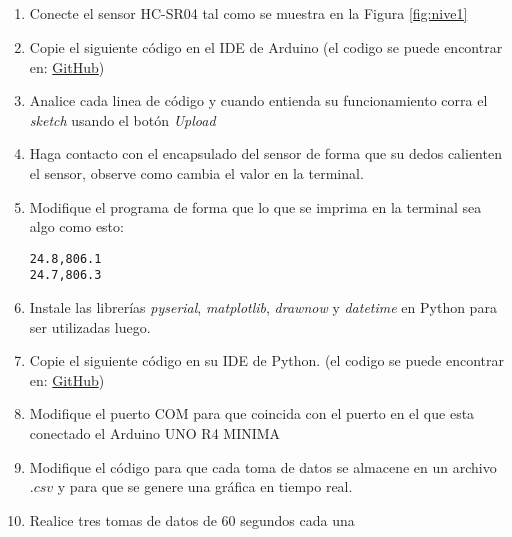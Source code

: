 \subsection{\pro}
\begin{enumerate}
    \item Conecte el sensor HC-SR04 tal como se muestra en la Figura \ref{fig:nive1}
    \item Copie el siguiente código en el IDE de Arduino (el codigo se puede encontrar en: \href{https://github.com/juanjorojash/instrumentacion_I/blob/master/algoritmos/BMP280/BMP280_lib/BMP280_lib.ino}{GitHub})
      
    \item Analice cada linea de código y cuando entienda su funcionamiento corra el \emph{sketch} usando el botón \emph{Upload}
    \item Haga contacto con el encapsulado del sensor de forma que su dedos calienten el sensor, observe como cambia el valor en la terminal. 
    \item Modifique el programa de forma que lo que se imprima en la terminal sea algo como esto:
\begin{verbatim}
24.8,806.1
24.7,806.3
\end{verbatim}
    \item Instale las librerías \emph{pyserial}, \emph{matplotlib}, \emph{drawnow} y \emph{datetime} en Python para ser utilizadas luego.
    \item Copie el siguiente código en su IDE de Python. (el codigo se puede encontrar en: \href{https://github.com/juanjorojash/instrumentacion_I/blob/master/algoritmos/BMP280/BMP280_lib/serial_read.py}{GitHub})
    
    \item Modifique el puerto COM para que coincida con el puerto en el que esta conectado el Arduino UNO R4 MINIMA
    \item Modifique el código para que cada toma de datos se almacene en un archivo $.csv$ y para que se genere una gráfica en tiempo real.
    \item Realice tres tomas de datos de 60 segundos cada una
\end{enumerate}


